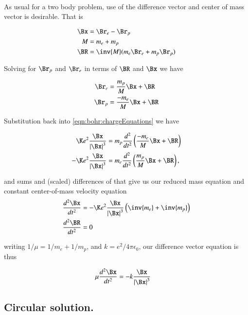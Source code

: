 As usual for a two body problem, use of the difference vector and center of mass vector is desirable.  That is

\begin{align*}
\Bx &= \Br_e - \Br_p \\
M &= m_e + m_p \\
\BR &= \inv{M}(m_e \Br_e + m_p \Br_p)
\end{align*}

Solving for $\Br_p$ and $\Br_e$ in terms of $\BR$ and $\Bx$ we have

\begin{align*}
\Br_e &= \frac{m_p}{M} \Bx + \BR \\
\Br_p &= \frac{-m_e}{M} \Bx + \BR \\
\end{align*}


Substitution back into \ref{eqn:bohr:chargeEquations} we have

\begin{align*}
  \K e^2 \frac {\Bx} { \Abs{\Bx}^3 } &= m_p \frac{d^2}{dt^2}\left( \frac{-m_e}{M} \Bx + \BR \right) \\
 -\K e^2 \frac {\Bx} { \Abs{\Bx}^3 } &= m_e \frac{d^2}{dt^2}\left( \frac{m_p}{M} \Bx + \BR \right),
\end{align*}

and sums and (scaled) differences of that give us our reduced mass equation and constant center-of-mass velocity equation
\begin{align}
\frac{d^2 \Bx}{dt^2} &= -\K e^2 \frac {\Bx} { \Abs{\Bx}^3 } \left( \inv{m_e} + \inv{m_p} \right) \\
\frac{d^2 \BR}{dt^2} &= 0
\end{align}

writing $1/\mu = 1/m_e + 1/m_p$, and $k = e^2/4 \pi \epsilon_0$, our difference vector equation is thus

\begin{align}\label{eqn:bohr:reduceEOM}
\mu \frac{d^2 \Bx}{dt^2} &= -k \frac {\Bx} { \Abs{\Bx}^3 }
\end{align}

\subsection{Circular solution. }

